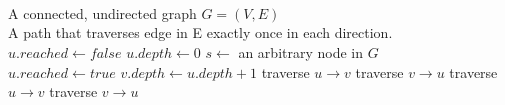 \documentclass{article}
\begin{document}
\section{}
\begin{algorithm}[H]
	\begin{algorithmic}
		\Require \\
			A connected, undirected graph $G=(V,E)$
		\Ensure \\
			A path that traverses edge in E exactly once in each direction. \\

			\State $u.reached \gets false$
			\State $u.depth \gets 0$
		\EndFor
		\State $s \gets$ an arbitrary node in $G$
		\State {}
		\\
			\State $u.reached \gets true$
					\State $v.depth \gets u.depth + 1$
					\State traverse $u \to v$
					\State \Call {DFS}{$v$}
					\State traverse $v \to u$
					\State traverse $u \to v$
					\State traverse $v \to u$
				\EndIf
			\EndFor
		\EndFunction

	\end{algorithmic}
\end{algorithm}

\section{}
\end{document}
